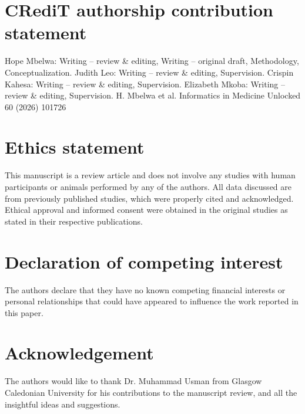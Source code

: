 \documentclass[final,5p,times,twocolumn,authoryear]{elsarticle}
\begin{document}
\section{CRediT authorship contribution statement}
Hope Mbelwa: Writing – review \& editing, Writing – original draft, Methodology, Conceptualization. Judith Leo: Writing – review \& editing, Supervision. Crispin Kahesa: Writing – review \& editing, Supervision. Elizabeth Mkoba: Writing – review \& editing, Supervision.
H. Mbelwa et al.
Informatics in Medicine Unlocked 60 (2026) 101726
\section{Ethics statement}
This manuscript is a review article and does not involve any studies with human participants or animals performed by any of the authors. All data discussed are from previously published studies, which were properly cited and acknowledged. Ethical approval and informed consent were obtained in the original studies as stated in their respective publications.
\section{Declaration of competing interest}
The authors declare that they have no known competing financial interests or personal relationships that could have appeared to influence the work reported in this paper.
\section{Acknowledgement}
The authors would like to thank Dr. Muhammad Usman from Glasgow Caledonian University for his contributions to the manuscript review, and all the insightful ideas and suggestions.

\end{document}
